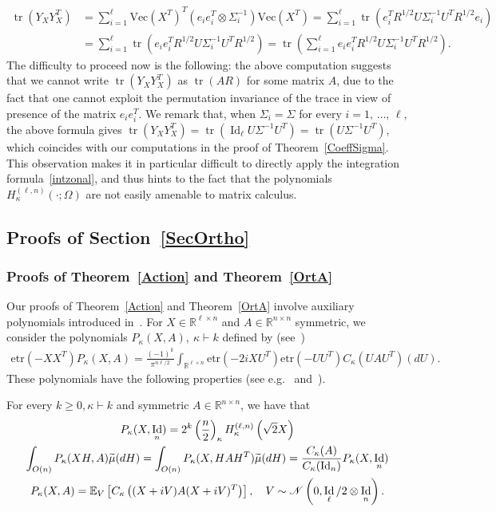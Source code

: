 \documentclass[AHL,Unicode,longabstracts,published]{cedram}
\DeclareMathOperator{\Id}{Id}
\DeclareMathOperator{\Tr}{tr}
\newcommand{\scN}{\mathscr{N}}
\renewcommand{\Vec}{\mathrm{Vec}}
\newcommand{\R}{\mathbb{R}}
\newcommand{\EX}[2]{\mathbb{E}_{#1}\left[#2\right]}
\newcommand{\etr}[1]{\mathrm{etr}\left(#1\right)}
\let\oldtilde\tilde
\renewcommand*{\tilde}[1]{\mathchoice{\widetilde{#1}}{\widetilde{#1}}{\oldtilde{#1}}{\oldtilde{#1}}}
\begin{document}
\begin{align*}
\Tr(Y_XY_X^T) &= \sum_{i=1}^{\ell}\Vec\left(X^T\right)^T \left(e_ie_i^T \otimes \Sigma_i^{-1}\right) \Vec(X^T) = \sum_{i=1}^{\ell} \Tr\left(e_i^T R^{1/2} U \Sigma^{-1}_i U^T R^{1/2} e_i
\right) \\
&= \sum_{i=1}^{\ell} \Tr\left(e_ie_i^T R^{1/2} U \Sigma^{-1}_i U^T R^{1/2} \right) = \Tr\left(\sum_{i=1}^{\ell}e_ie_i^T R^{1/2} U \Sigma^{-1}_i U^T R^{1/2}\right).
\end{align*}
The difficulty to proceed now is the following: the above computation suggests that we cannot write $\Tr(Y_XY_X^T)$ as $\Tr(AR)$ for some matrix $A$, due to the fact that one cannot exploit the permutation invariance of the trace in view of presence of the matrix $e_i e_i^T$. We remark that, when $\Sigma_i=\Sigma$ for every $i=1,\,\ldots,\,\ell$, the above formula gives $\Tr(Y_XY_X^T)= \Tr(\Id_{\ell}U\Sigma^{-1}U^T)=\Tr(U\Sigma^{-1}U^T) $, which coincides with our computations in the proof of Theorem~\ref{CoeffSigma}. This observation makes it in particular difficult to directly apply the integration formula~\eqref{intzonal}, and thus hints to the fact that the polynomials $H_{\kappa}^{(\ell,n)}(\cdot;\Omega)$ are not easily amenable to matrix calculus.

\subsection{Proofs of Section~\ref{SecOrtho}}



\subsubsection*{Proofs of Theorem~\ref{Action} and Theorem~\ref{OrtA}}
Our proofs of Theorem~\ref{Action} and Theorem~\ref{OrtA} involve auxiliary polynomials introduced in~\cite{Hay}. For $X \in \R^{\ell \times n}$ and $ A \in \R^{n\times n}$ symmetric, we consider the polynomials $P_{\kappa}(X,A), \ \kappa \vdash k$ defined by (see~\cite[Eq.~(34)]{Hay})
\begin{gather*}
\etr{-XX^T}P_{\kappa}(X,A)=\frac{(-1)^k}{\pi^{n\ell/2}} \int_{\R^{\ell\times n}} \etr{-2iXU^T}\etr{-UU^T}C_{\kappa}\left(UAU^T\right) (dU).
\end{gather*}
These polynomials have the following properties (see e.g.~\cite[p.~229]{BFZP} and~\cite[Section~6]{Hay}).

\begin{lemm}
For every $k\geq 0, \kappa \vdash k$ and symmetric $A\in \R^{n\times n}$, we have that
\begin{gather}
P_{\kappa}(X,\Id_n) = 2^k\left(\frac{n}{2}\right)_{\kappa} H_{\kappa}^{(\ell,n)}\left(\sqrt{2}X\right) \label{P1}
\\
\int_{O(n)} P_{\kappa}(XH,A) \tilde{\mu}(dH) = \int_{O(n)} P_{\kappa}(X,HAH^T) \tilde{\mu}(dH) = \frac{C_{\kappa}(A)}{C_{\kappa}(\Id_n)} P_{\kappa}(X,\Id_n) \label{P2}
\\
P_{\kappa}(X,A) = \EX{V}{C_{\kappa}\left((X+iV)A(X+iV)^T\right)}, \quad V \sim \scN\left(0,\Id_{\ell}/2\otimes\Id_n\right). \label{P3}
\end{gather}
\end{lemm}
\end{document}
